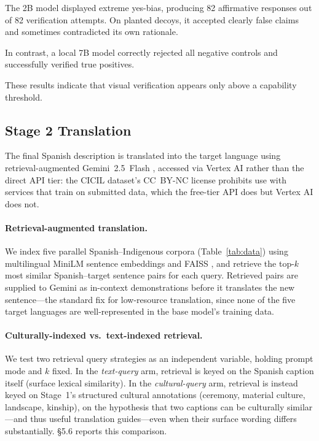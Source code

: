 \documentclass[11pt]{article}
\begin{document}
The 2B model displayed extreme yes-bias, producing 82 affirmative responses
out of 82 verification attempts. On planted decoys, it accepted clearly false
claims and sometimes contradicted its own rationale.

In contrast, a local 7B model correctly rejected all negative controls and
successfully verified true positives.

These results indicate that visual verification appears only above a
capability threshold.

\subsection{Stage 2 Translation}
The final Spanish description is translated into the target language using
retrieval-augmented Gemini~2.5~Flash \citep{comanici2025gemini}, accessed via
Vertex AI rather than the direct API tier: the CICIL dataset's CC~BY-NC
license prohibits use with services that train on submitted data, which the
free-tier API does but Vertex AI does not.

\paragraph{Retrieval-augmented translation.} We index five parallel
Spanish--Indigenous corpora (Table~\ref{tab:data}) using multilingual MiniLM
sentence embeddings \citep{reimers2020multilingual} and FAISS
\citep{johnson2019faiss}, and retrieve the top-$k$ most similar
Spanish--target sentence pairs for each query. Retrieved pairs are supplied
to Gemini as in-context demonstrations before it translates the new
sentence---the standard fix for low-resource translation, since none of the
five target languages are well-represented in the base model's training
data.

\paragraph{Culturally-indexed vs.\ text-indexed retrieval.} We test two
retrieval query strategies as an independent variable, holding prompt mode
and $k$ fixed. In the \emph{text-query} arm, retrieval is keyed on the
Spanish caption itself (surface lexical similarity). In the
\emph{cultural-query} arm, retrieval is instead keyed on Stage~1's
structured cultural annotations (ceremony, material culture, landscape,
kinship), on the hypothesis that two captions can be culturally similar---and
thus useful translation guides---even when their surface wording differs
substantially. \S5.6 reports this comparison.
\end{document}
